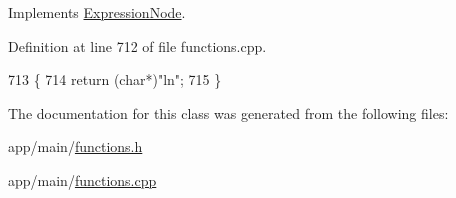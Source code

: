Implements \hyperlink{classExpressionNode_a42a5e9562b0f645a19dcc83f698069b5}{Expression\+Node}.



Definition at line 712 of file functions.\+cpp.


\begin{DoxyCode}
713 \{
714     \textcolor{keywordflow}{return} (\textcolor{keywordtype}{char}*)\textcolor{stringliteral}{"ln"};
715 \}
\end{DoxyCode}


The documentation for this class was generated from the following files\+:\begin{DoxyCompactItemize}
\item 
app/main/\hyperlink{functions_8h}{functions.\+h}\item 
app/main/\hyperlink{functions_8cpp}{functions.\+cpp}\end{DoxyCompactItemize}
